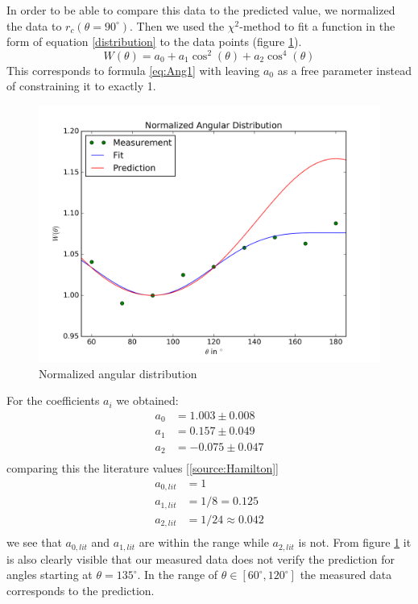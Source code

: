 \documentclass[a4paper,parskip,11pt, DIV12]{scrreprt}
\begin{document}
%
In order to be able to compare this data to the predicted value, we normalized the data to $r_{c}(\theta=90^{\circ})$. Then we used the $\chi^2$-method to fit a function in the form of equation \ref{distribution} to the data points (figure \ref{fig:distribution}).
\begin{equation}
W(\theta) = a_0 + a_1 \cos^2(\theta) + a_2 \cos^4(\theta)
\end{equation}
This corresponds to formula \ref{eq:Ang1} with leaving $a_0$ as a free parameter instead of constraining it to exactly 1.
%
\begin{figure}[H]
\centering
\includegraphics[scale=0.65]{dist.png}
\caption[Distribution]{Normalized angular distribution}
\label{fig:distribution}
\end{figure}
%
For the coefficients $a_i$ we obtained:
%
\begin{align*}
a_0 &= 1.003 \pm 0.008\\
a_1 &= 0.157 \pm 0.049\\
a_2 &= -0.075 \pm 0.047\\
\end{align*}
%
comparing this the literature values [\ref{source:Hamilton}]
%
\begin{align*}
a_{0,lit} &= 1\\
a_{1,lit} &= 1/8 = 0.125\\
a_{2,lit} &= 1/24 \approx 0.042\\
\end{align*}
%
we see that $a_{0,lit}$ and $a_{1,lit}$ are within the range while $a_{2,lit}$ is not. From figure \ref{fig:distribution} it is also clearly visible that our measured data does not verify the prediction for angles starting at $\theta=135^{\circ}$. In the range of $\theta \in \left[60^{\circ},120^{\circ}\right]$ the measured data corresponds to the prediction.
\end{document}
